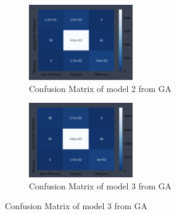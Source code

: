\documentclass[11pt, natbib=false]{article}
\begin{document}
\newpage
\begin{figure}[h!]\ContinuedFloat
  \centering

  \begin{subfigure}[b]{1.0\linewidth}
  \centering
  \caption{Confusion Matrix of model 2 from GA}
  \includegraphics[width=0.5\textwidth]{./GA_model2_cm.png}
  \end{subfigure}

  \begin{subfigure}[b]{1.0\linewidth}
  \centering
  \caption{Confusion Matrix of model 3 from GA}
  \includegraphics[width=0.5\textwidth]{./GA_model3_cm.png}
  \end{subfigure}

\end{figure}
\end{document}
